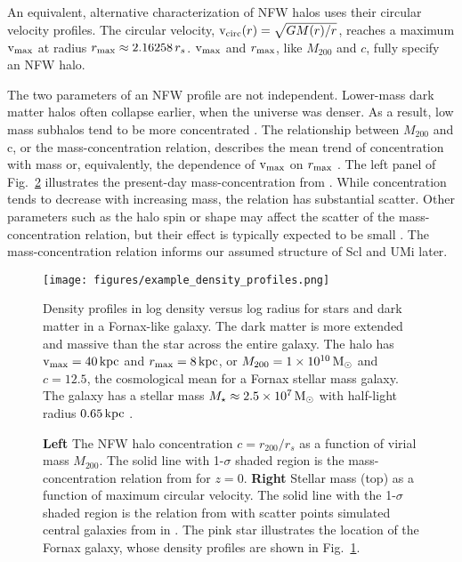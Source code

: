 An equivalent, alternative characterization of NFW halos uses their
circular velocity profiles. The circular velocity,
\({\rm v}_{\rm circ}(r) = \sqrt{G M(r) / r}\), reaches a maximum \({\rm v}_{\rm max}\) at radius
\(r_{\rm max} \approx 2.16258\,r_s\). \({\rm v}_{\rm max}\) and \(r_{\rm max}\), like
\(M_{200}\) and \(c\), fully specify an NFW halo.

The two parameters of an NFW profile are not independent. Lower-mass
dark matter halos often collapse earlier, when the universe was denser.
As a result, low mass subhalos tend to be more concentrated
\citep[e.g.,][]{NFW1997}. The relationship between \(M_{200}\) and c, or
the mass-concentration relation, describes the mean trend of
concentration with mass or, equivalently, the dependence of \({\rm v}_{\rm max}\) on
\(r_{\rm max}\) \citep[e.g.,][]{bullock+2001, ludlow+2016}. The left panel of
Fig.~\ref{fig:smhm} illustrates the present-day mass-concentration from
\citet{ludlow+2016}. While concentration tends to decrease with
increasing mass, the relation has substantial scatter. Other parameters
such as the halo spin or shape may affect the scatter of the
mass-concentration relation, but their effect is typically expected to
be small \citep{navarro+2010, dicintio+2013, dutton+maccio2014}. The
mass-concentration relation informs our assumed structure of Scl and UMi
later.

\begin{figure}
\centering
\texttt{[image: figures/example\_density\_profiles.png]}
\caption[Example density profiles]{Density profiles in log density
versus log radius for stars and dark matter in a Fornax-like galaxy. The
dark matter is more extended and massive than the star across the entire
galaxy. The halo has \({\rm v}_{\rm max}=40\,{\rm kpc}\) and \(r_{\rm max}=8\,{\rm kpc}\), or
\(M_{200} = 1\times10^{10}\,{\rm M}_{\odot}\) and \(c=12.5\), the cosmological mean
for a Fornax stellar mass galaxy. The galaxy has a stellar mass
\(M_\star \approx 2.5\times10^7\,{\rm M}_{\odot}\) with half-light radius
\(0.65\,{\rm kpc}\)
\citep{munoz+2018, woo+courteau+dekel2008}.}\label{fig:nfw_density}
\end{figure}

\begin{figure}
\centering
{}
\caption[Stellar-mass halo-mass relation]{\textbf{Left} The NFW halo
concentration \(c=r_{200} / r_s\) as a function of virial mass
\(M_{200}\). The solid line with 1-\(\sigma\) shaded region is the
mass-concentration relation from \citet{ludlow+2016} for \(z=0\).
\textbf{Right} Stellar mass (top) as a function of maximum circular
velocity. The solid line with the 1-\(\sigma\) shaded region is the
relation from \citet{fattahi+2018} with scatter points simulated central
galaxies from \apostle{} in \citet{fattahi+2018}. The pink star
illustrates the location of the Fornax galaxy, whose density profiles
are shown in Fig.~\ref{fig:nfw_density}.}\label{fig:smhm}
\end{figure}

